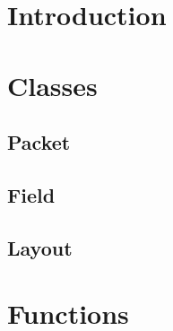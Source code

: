 \documentclass[11pt]{article}
\begin{document}
\section{Introduction}

\section{Classes}

\subsection{Packet}

\subsection{Field}

\subsection{Layout}

\section{Functions}
\end{document}
